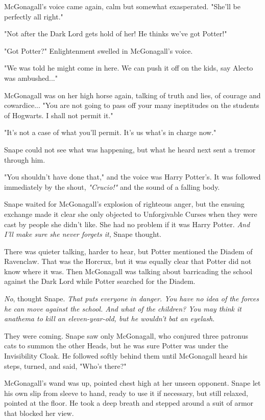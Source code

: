 McGonagall's voice came again, calm but somewhat exasperated. "She'll be perfectly all right."

"Not after the Dark Lord gets hold of her! He thinks we've got Potter!"

"Got Potter?" Enlightenment swelled in McGonagall's voice.

"We was told he might come in here. We can push it off on the kids, say Alecto was ambushed..."

McGonagall was on her high horse again, talking of truth and lies, of courage and cowardice... "You are not going to pass off your many ineptitudes on the students of Hogwarts. I shall not permit it."

"It's not a case of what you'll permit. It's us what's in charge now."

Snape could not see what was happening, but what he heard next sent a tremor through him.

"You shouldn't have done that," and the voice was Harry Potter's. It was followed immediately by the shout, \emph{"Crucio!"} and the sound of a falling body.

Snape waited for McGonagall's explosion of righteous anger, but the ensuing exchange made it clear she only objected to Unforgivable Curses when they were cast by people she didn't like. She had no problem if it was Harry Potter. \emph{And I'll make sure she never forgets it,} Snape thought.

There was quieter talking, harder to hear, but Potter mentioned the Diadem of Ravenclaw. That was the Horcrux, but it was equally clear that Potter did not know where it was. Then McGonagall was talking about barricading the school against the Dark Lord while Potter searched for the Diadem.

\emph{No}, thought Snape. \emph{That puts everyone in danger. You have no idea of the forces he can move against the school. And what of the children? You may think it anathema to kill an eleven-year-old, but he wouldn't bat an eyelash}.

They were coming. Snape saw only McGonagall, who conjured three patronus cats to summon the other Heads, but he was sure Potter was under the Invisibility Cloak. He followed softly behind them until McGonagall heard his steps, turned, and said, "Who's there?"

McGonagall's wand was up, pointed chest high at her unseen opponent. Snape let his own slip from sleeve to hand, ready to use it if necessary, but still relaxed, pointed at the floor. He took a deep breath and stepped around a suit of armor that blocked her view.

